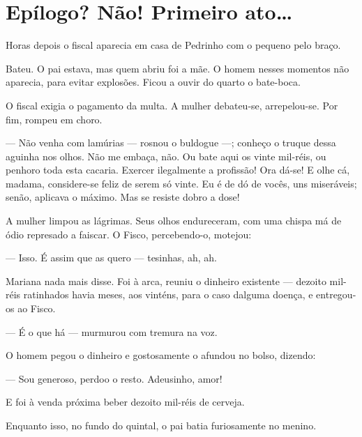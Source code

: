 \section{Epílogo? Não! Primeiro ato\ldots{}}

Horas depois o fiscal aparecia em casa de Pedrinho com o pequeno pelo
braço.

Bateu. O pai estava, mas quem abriu foi a mãe. O homem nesses momentos
não aparecia, para evitar explosões. Ficou a ouvir do quarto o
bate-boca.

O fiscal exigia o pagamento da multa. A mulher debateu-se, arrepelou-se.
Por fim, rompeu em choro.

--- Não venha com lamúrias --- rosnou o buldogue ---; conheço o truque
dessa aguinha nos olhos. Não me embaça, não. Ou bate aqui os vinte
mil-réis, ou penhoro toda esta cacaria. Exercer ilegalmente a profissão!
Ora dá-se! E olhe cá, madama, considere-se feliz de serem só vinte. Eu é
de dó de vocês, uns miseráveis; senão, aplicava o máximo. Mas se resiste
dobro a dose!

A mulher limpou as lágrimas. Seus olhos endureceram, com uma chispa má
de ódio represado a faiscar. O Fisco, percebendo-o, motejou:

--- Isso. É assim que as quero --- tesinhas, ah, ah.

Mariana nada mais disse. Foi à arca, reuniu o dinheiro existente ---
dezoito mil-réis ratinhados havia meses, aos vinténs, para o caso
dalguma doença, e entregou-os ao Fisco.

--- É o que há --- murmurou com tremura na voz.

O homem pegou o dinheiro e gostosamente o afundou no bolso, dizendo:

--- Sou generoso, perdoo o resto. Adeusinho, amor!

E foi à venda próxima beber dezoito mil-réis de cerveja.

Enquanto isso, no fundo do quintal, o pai batia furiosamente no menino.

\blankpage

